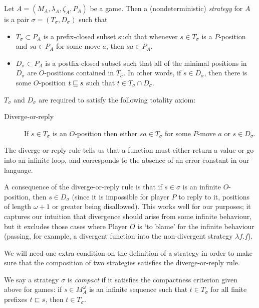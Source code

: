 \documentclass{article}
\begin{document}
\begin{definition}
  Let $A=(M_A,\lambda_A,\zeta_A,P_A)$ be a game.  Then a (nondeterministic) \emph{strategy} for $A$ is a pair $\sigma=(T_\sigma,D_\sigma)$ such that
  \begin{itemize}
    \item $T_\sigma\subset P_A$ is a prefix-closed subset such that whenever $s\in T_\sigma$ is a $P$-position and $sa\in P_A$ for some move $a$, then $sa\in P_A$.
    \item $D_\sigma\subset P_A$ is a postfix-closed subset such that all of the minimal positions in $D_\sigma$ are $O$-positions contained in $T_\sigma$.  In other words, if $s\in D_\sigma$, then there is some $O$-position $t\sqsubseteq s$ such that $t\in T_\sigma\cap D_\sigma$.
  \end{itemize}

  $T_\sigma$ and $D_\sigma$ are required to satisfy the following totality axiom:
  \begin{description}
    \item[Diverge-or-reply] If $s\in T_\sigma$ is an $O$-position then either $sa\in T_\sigma$ for some $P$-move $a$ or $s\in D_\sigma$.  
  \end{description}

  The diverge-or-reply rule tells us that a function must either return a value or go into an infinite loop, and corresponds to the absence of an error constant in our language.  

  A consequence of the diverge-or-reply rule is that if $s\in \sigma$ is an infinite $O$-position, then $s\in D_\sigma$ (since it is impossible for player $P$ to reply to it, positions of length $\omega+1$ or greater being disallowed).  This works well for our purposes; it captures our intuition that divergence should arise from some infinite behaviour, but it excludes those cases where Player $O$ is `to blame' for the infinite behaviour (passing, for example, a divergent function into the non-divergent strategy $\lambda f.f$).  
\end{definition}

We will need one extra condition on the definition of a strategy in order to make sure that the composition of two strategies satisfies the diverge-or-reply rule.

\begin{definition}
  We say a strategy $\sigma$ is \emph{compact} if it satisfies the compactness criterion given above for games: if $s\in M_A^\omega$ is an infinite sequence such that $t\in T_\sigma$ for all finite prefixes $t\sqsubset s$, then $t\in T_\sigma$.  
\end{definition}
\end{document}
